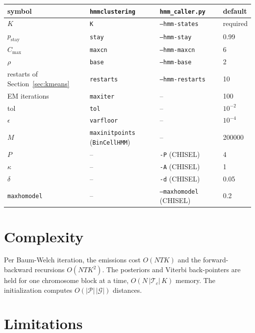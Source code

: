 \documentclass[11pt]{article}
\newcommand{\code}[1]{\texttt{#1}}
\newcommand{\pstay}{p_{\mathrm{stay}}}
\begin{document}
\begin{center}
\begin{tabular}{@{}llll@{}}
\toprule
symbol & \code{hmmclustering} & \code{hmm\_caller.py} & default \\
\midrule
$K$ & \code{K} & \code{--hmm-states} & required \\
$\pstay$ & \code{stay} & \code{--hmm-stay} & 0.99 \\
$C_{\max}$ & \code{maxcn} & \code{--hmm-maxcn} & 6 \\
$\rho$ & \code{base} & \code{--hmm-base} & 2 \\
restarts of Section~\ref{sec:kmeans} & \code{restarts} & \code{--hmm-restarts} & 10 \\
EM iterations & \code{maxiter} & -- & 100 \\
tol & \code{tol} & -- & $10^{-2}$ \\
$\epsilon$ & \code{varfloor} & -- & $10^{-4}$ \\
$M$ & \code{maxinitpoints} (\code{BinCellHMM}) & -- & 200000 \\
\midrule
$P$ & -- & \code{-P} (CHISEL) & 4 \\
$\kappa$ & -- & \code{-A} (CHISEL) & 1 \\
$\delta$ & -- & \code{-d} (CHISEL) & 0.05 \\
\code{maxhomodel} & -- & \code{--maxhomodel} (CHISEL) & 0.2 \\
\bottomrule
\end{tabular}
\end{center}

\section{Complexity}\label{sec:complexity}

Per Baum-Welch iteration, the emissions cost $O(NTK)$ and the forward-backward recursions
$O(NTK^2)$. The posteriors and Viterbi back-pointers are held for one chromosome block at a time,
$O(N\,|\mathcal{T}_c|\,K)$ memory. The initialization computes $O(|\mathcal{P}|\,|\mathcal{G}|)$
distances.

\section{Limitations}\label{sec:limitations}
\end{document}

